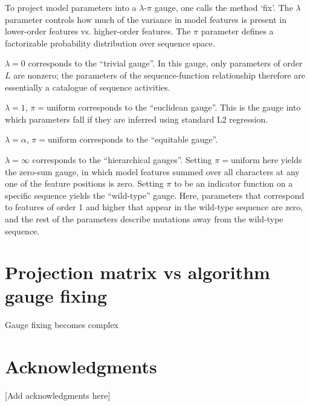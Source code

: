 \documentclass[12pt,letterpaper]{article}
\begin{document}
To project model parameters into a $\lambda$-$\pi$ gauge, one calls the method `fix'. The $\lambda$ parameter controls how much of the variance in model features is present in lower-order features vs. higher-order features. The $\pi$ parameter defines a factorizable probability distribution over sequence space. 

$\lambda = 0$ corresponds to the ``trivial gauge''. In this gauge, only parameters of order $L$ are nonzero; the parameters of the sequence-function relationship therefore are essentially a catalogue of sequence activities. 

$\lambda = 1$, $\pi = \text{uniform}$ corresponds to the ``euclidean gauge''. This is the gauge into which parameters fall if they are inferred using standard L2 regression. 

$\lambda = \alpha$, $\pi = \text{uniform}$ corresponds to the ``equitable gauge''.

$\lambda = \infty$ corresponds to the ``hierarchical gauges''. Setting $\pi = \text{uniform}$ here yields the zero-sum gauge, in which model features summed over all characters at any one of the feature positions is zero. Setting $\pi$ to be an indicator function on a specific sequence yields the ``wild-type'' gauge. Here, parameters that correspond to features of order 1 and higher that appear in the wild-type sequence are zero, and the rest of the parameters describe mutations away from the wild-type sequence.

\section{Projection matrix vs algorithm gauge fixing}
Gauge fixing becomes complex 


\section*{Acknowledgments}
[Add acknowledgments here]



\end{document}
